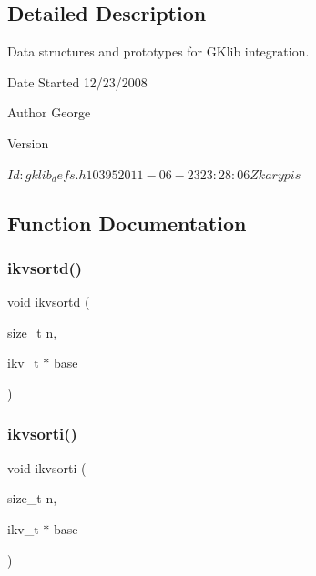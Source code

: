\subsection{Detailed Description}
Data structures and prototypes for G\+Klib integration. 

\begin{DoxyDate}{Date}
Started 12/23/2008 
\end{DoxyDate}
\begin{DoxyAuthor}{Author}
George 
\end{DoxyAuthor}
\begin{DoxyVersion}{Version}
\begin{DoxyVerb}$Id: gklib_defs.h 10395 2011-06-23 23:28:06Z karypis $ \end{DoxyVerb}
 
\end{DoxyVersion}


\subsection{Function Documentation}
\mbox{\label{a00209_ade88b48ed46595efb31adeaff9edd061}} 
\subsubsection{\texorpdfstring{ikvsortd()}{ikvsortd()}}
{\footnotesize\ttfamily void ikvsortd (\begin{DoxyParamCaption}\item[{size\+\_\+t}]{n,  }\item[{ikv\+\_\+t $\ast$}]{base }\end{DoxyParamCaption})}

\mbox{\label{a00209_a5789edd7474ebff4ba748d7f061d86fb}} 
\subsubsection{\texorpdfstring{ikvsorti()}{ikvsorti()}}
{\footnotesize\ttfamily void ikvsorti (\begin{DoxyParamCaption}\item[{size\+\_\+t}]{n,  }\item[{ikv\+\_\+t $\ast$}]{base }\end{DoxyParamCaption})}

